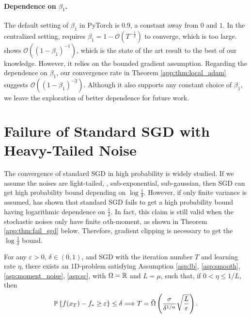 \documentclass{article} %
\numberwithin{equation}{section}
\begin{document}
\paragraph{Dependence on $\beta_1$.}
The default setting of $\beta_1$ in PyTorch is $0.9$, a constant away from $0$ and $1$.
In the centralized setting, \cite{li2024convergence} requires $\beta_1=1-\mathcal{O}(T^{-\frac{1}{2}})$ to converge, which is too large.
\cite{defossez2020simple} shows $\mathcal{O}\left((1-\beta_1)^{-1}\right)$, which is the state of the art result to the best of our knowledge. 
However, it relies on the bounded gradient assumption. 
Regarding the dependence on $\beta_1$, our convergence rate in Theorem \ref{app:thm:local_adam} suggests $\mathcal{O}\left((1-\beta_1)^{-2}\right)$. 
Although it also supports any constant choice of $\beta_1$, we leave the exploration of better dependence for future work.

\section{Failure of Standard SGD with Heavy-Tailed Noise}\label{app:sec:fail_sgd}

The convergence of standard SGD in high probability is widely studied. 
If we assume the noises are light-tailed, \eg, sub-exponential, sub-gaussian, then SGD can get high probability bound depending on $\log\frac{1}{\delta}$.
However, if only finite variance is assumed, \cite{pmlr-v202-sadiev23a} has shown that standard SGD fails to get a high probability bound having logarithmic dependence on $\frac{1}{\delta}$. 
In fact, this claim is still valid when the stochastic noises only have finite $\alpha$th-moment, as shown in Theorem \ref{app:thm:fail_sgd}  below. 
Therefore, gradient clipping is necessary to get the $\log\frac{1}{\delta}$ bound.

\begin{thm}\label{app:thm:fail_sgd}
    For any $\varepsilon > 0$, $\delta \in (0,1)$, and SGD with the iteration number $T$ and learning rate $\eta$, there exists an 1D-problem satisfying Assumption \ref{asp:lb}, \ref{asp:smooth}, \ref{asp:moment_noise}, \ref{asp:sc}, with $\Omega=\mathbb{R}$ and $L=\mu$, such that, if $0 < \eta \leq 1/L$, then
    \begin{equation}
        \mathbb{P} \left\{f(x_T)-f_* \geq \varepsilon\right\} \leq \delta \Longrightarrow T = \Tilde{\Omega} \left(\frac{\sigma}{\delta^{1/\alpha}}\sqrt{\frac{L}{\varepsilon}}\right).
    \end{equation}
\end{thm}
\end{document}
